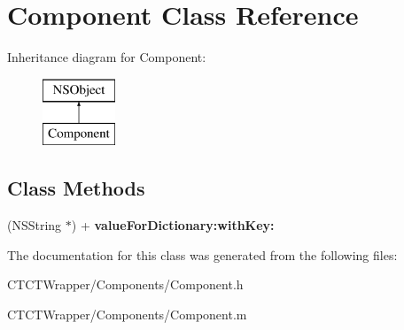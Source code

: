 \hypertarget{interface_component}{\section{Component Class Reference}
\label{interface_component}
}
Inheritance diagram for Component\-:\begin{figure}[H]
\begin{center}
\leavevmode
\includegraphics[height=2.000000cm]{interface_component}
\end{center}
\end{figure}
\subsection*{Class Methods}
\begin{DoxyCompactItemize}
\item 
\hypertarget{interface_component_aa030f77512098e08b0779f5960deaf43}{(N\-S\-String $\ast$) + {\bfseries value\-For\-Dictionary\-:with\-Key\-:}}\label{interface_component_aa030f77512098e08b0779f5960deaf43}

\end{DoxyCompactItemize}


The documentation for this class was generated from the following files\-:\begin{DoxyCompactItemize}
\item 
C\-T\-C\-T\-Wrapper/\-Components/Component.\-h\item 
C\-T\-C\-T\-Wrapper/\-Components/Component.\-m\end{DoxyCompactItemize}
